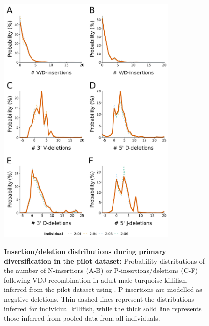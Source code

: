 \begin{figure}
\centering
\includegraphics[width = 0.8\textwidth]{_Figures/png/pilot-igor-indels}
\begin{subfigure}{0em}
\label{fig:igseq-pilot-igor-indels-vdins}
\end{subfigure}
\begin{subfigure}{0em}
\label{fig:igseq-pilot-igor-indels-djins}
\end{subfigure}
\begin{subfigure}{0em}
\label{fig:igseq-pilot-igor-indels-vdel}
\end{subfigure}
\begin{subfigure}{0em}
\label{fig:igseq-pilot-igor-indels-d5del}
\end{subfigure}
\begin{subfigure}{0em}
\label{fig:igseq-pilot-igor-indels-d3del}
\end{subfigure}
\begin{subfigure}{0em}
\label{fig:igseq-pilot-igor-indels-jdel}
\end{subfigure}
\caption[Insertion/deletion distributions during primary diversification in the pilot dataset]
{\textbf{Insertion/deletion distributions during primary diversification in the pilot dataset:} Probability distributions of the number of N-insertions (A-B) or P-insertions/deletions (C-F) following VDJ recombination in adult male turquoise killifish, inferred from the \igseq pilot dataset using . P-insertions are modelled as negative deletions. Thin dashed lines represent the distributions inferred for individual killifish, while the thick solid line represents those inferred from pooled data from all individuals.}
\label{fig:igseq-pilot-igor-indels}
\end{figure}

